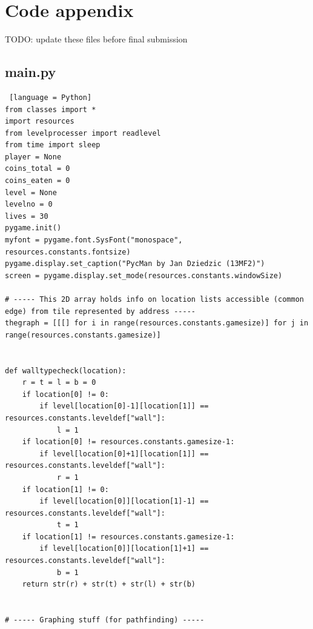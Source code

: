 \documentclass[11pt,a4paper,notitlepage]{report}
\begin{document}
	\chapter{Code appendix}
	TODO: update these files before final submission
		\section{main.py}
			\begin{lstlisting} [language = Python]
from classes import *
import resources
from levelprocesser import readlevel
from time import sleep
player = None
coins_total = 0
coins_eaten = 0
level = None
levelno = 0
lives = 30
pygame.init()
myfont = pygame.font.SysFont("monospace", resources.constants.fontsize)
pygame.display.set_caption("PycMan by Jan Dziedzic (13MF2)")
screen = pygame.display.set_mode(resources.constants.windowSize)

# ----- This 2D array holds info on location lists accessible (common edge) from tile represented by address -----
thegraph = [[[] for i in range(resources.constants.gamesize)] for j in range(resources.constants.gamesize)]


def walltypecheck(location):
	r = t = l = b = 0
	if location[0] != 0:
		if level[location[0]-1][location[1]] == resources.constants.leveldef["wall"]:
			l = 1
	if location[0] != resources.constants.gamesize-1:
		if level[location[0]+1][location[1]] == resources.constants.leveldef["wall"]:
			r = 1
	if location[1] != 0:
		if level[location[0]][location[1]-1] == resources.constants.leveldef["wall"]:
			t = 1
	if location[1] != resources.constants.gamesize-1:
		if level[location[0]][location[1]+1] == resources.constants.leveldef["wall"]:
			b = 1
	return str(r) + str(t) + str(l) + str(b)


# ----- Graphing stuff (for pathfinding) -----



\end{lstlisting}
\end{document}

